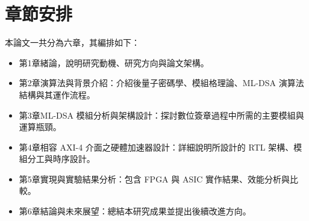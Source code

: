 \documentclass[12pt, a4paper]{./styles/ntust_report}
\begin{document}
\section{章節安排}
本論文一共分為六章，其編排如下：
\begin{itemize}
\setlength{\itemsep}{2pt}
\setlength{\parsep}{2pt}
\setlength{\parskip}{2pt}
  \item 第1章緒論，說明研究動機、研究方向與論文架構。
  \item 第2章演算法與背景介紹：介紹後量子密碼學、模組格理論、ML-DSA 演算法結構與其運作流程。
  \item 第3章ML-DSA 模組分析與架構設計：探討數位簽章過程中所需的主要模組與運算瓶頸。
  \item 第4章相容 AXI-4 介面之硬體加速器設計：詳細說明所設計的 RTL 架構、模組分工與時序設計。
  \item 第5章實現與實驗結果分析：包含 FPGA 與 ASIC 實作結果、效能分析與比較。
  \item 第6章結論與未來展望：總結本研究成果並提出後續改進方向。
\end{itemize}

\ifdefined\integrated\else

\end{document}
